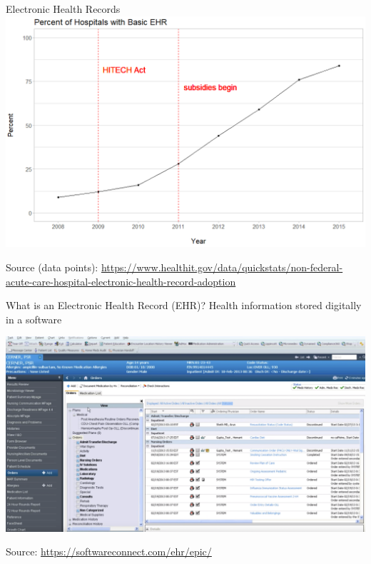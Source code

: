 \documentclass[notes,11pt, aspectratio=169]{beamer}
\begin{document}
\begin{frame}{Electronic Health Records}
    \centering
    \includegraphics[scale=.4]{Objects/EHR_adoption_graph.PNG}
    
    \tiny{Source (data points): \hyperlink{https://www.healthit.gov/data/quickstats/non-federal-acute-care-hospital-electronic-health-record-adoption}{https://www.healthit.gov/data/quickstats/non-federal-acute-care-hospital-electronic-health-record-adoption}}
\end{frame}

\begin{frame}[fragile]{What is an Electronic Health Record (EHR)?}
Health information stored digitally in a software
                \vspace{2mm}
\begin{center}
\includegraphics[scale=.25]{Objects/cernerscreenshot.png}

\tiny{Source: \hyperlink{https://softwareconnect.com/ehr/epic/}{https://softwareconnect.com/ehr/epic/}}
\vspace{-4mm}
\end{center}
\end{frame}
\end{document}
